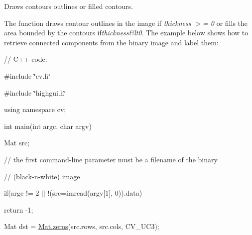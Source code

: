 Draws contours outlines or filled contours.

The function draws contour outlines in the image if {\itshape thickness $>$= 0} or fills the area bounded by the contours if{\itshape thickness\&lt0}. The example below shows how to retrieve connected components from the binary image and label them\+: {\ttfamily }

{\ttfamily }

{\ttfamily }

{\ttfamily // C++ code\+:}

{\ttfamily }

{\ttfamily }

{\ttfamily \#include \char`\"{}cv.\+h\char`\"{}}

{\ttfamily }

{\ttfamily }

{\ttfamily \#include \char`\"{}highgui.\+h\char`\"{}}

{\ttfamily }

{\ttfamily }

{\ttfamily using namespace cv;}

{\ttfamily }

{\ttfamily }

{\ttfamily int main(int argc, char argv)}

{\ttfamily }

{\ttfamily }

{\ttfamily Mat src;}

{\ttfamily }

{\ttfamily }

{\ttfamily // the first command-\/line parameter must be a filename of the binary}

{\ttfamily }

{\ttfamily }

{\ttfamily // (black-\/n-\/white) image}

{\ttfamily }

{\ttfamily }

{\ttfamily if(argc != 2 $\vert$$\vert$ !(src=imread(argv\mbox{[}1\mbox{]}, 0)).data)}

{\ttfamily }

{\ttfamily }

{\ttfamily return -\/1;}

{\ttfamily }

{\ttfamily }

{\ttfamily Mat dst = \mbox{\hyperlink{classorg_1_1opencv_1_1core_1_1_mat_aff41070138369b96f792b19f01ab00d9}{Mat.\+zeros}}(src.\+rows, src.\+cols, C\+V\+\_\+U\+C3);}

